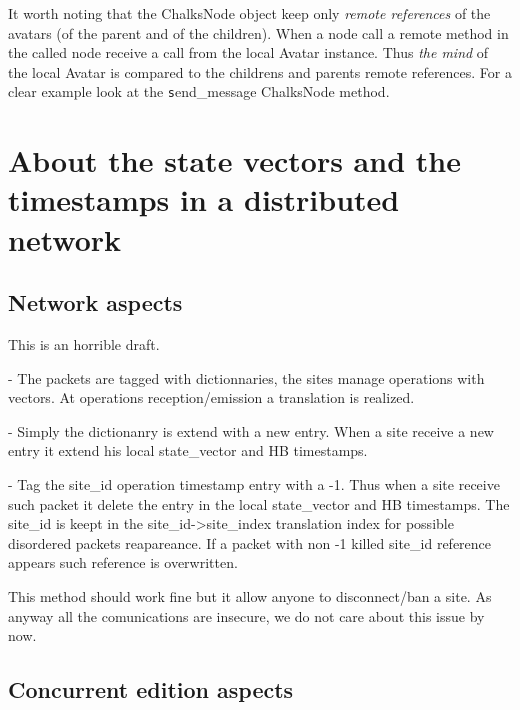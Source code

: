 \documentclass{report}
\begin{document}
It worth noting that the ChalksNode object keep only \emph{remote references} of the avatars (of the parent and of the children). When a node call a remote method in the called node receive a call from the local Avatar instance. Thus \emph{the mind} of the local Avatar is compared to the childrens and parents remote references. For a clear example look at the {\texttt send\_message} ChalksNode method.

\section{About the state vectors and the timestamps in a distributed network}




\subsection{Network aspects}

This is an horrible draft.

- The packets are tagged with dictionnaries, the sites manage operations with vectors. At operations reception/emission a translation is realized.


- Simply the dictionanry is extend with a new entry. When a site receive a new entry it extend his local state_vector and HB timestamps.


- Tag the site_id operation timestamp entry with a -1. Thus when a site receive such packet it delete the entry in the local state_vector and HB timestamps. The site_id is keept in the site_id->site_index translation index for possible disordered packets reapareance. If a packet with non -1 killed site_id reference appears such reference is overwritten.

This method should work fine but it allow anyone to disconnect/ban a site. As anyway all the comunications are insecure, we do not care about this issue by now.

\subsection{Concurrent edition aspects}
\end{document}
